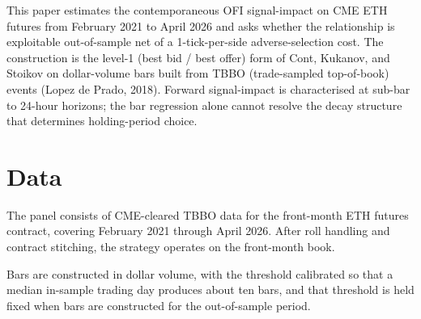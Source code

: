 ﻿\documentclass[11pt,a4paper]{article}
\begin{document}
This paper estimates the contemporaneous OFI signal-impact on CME ETH futures from February 2021 to April 2026 and asks whether the relationship is exploitable out-of-sample net of a 1-tick-per-side adverse-selection cost. The construction is the level-1 (best bid / best offer) form of Cont, Kukanov, and Stoikov on dollar-volume bars built from TBBO (trade-sampled top-of-book) events (Lopez de Prado, 2018). Forward signal-impact is characterised at sub-bar to 24-hour horizons; the bar regression alone cannot resolve the decay structure that determines holding-period choice.

\section{Data}

The panel consists of CME-cleared TBBO data for the front-month ETH futures contract, covering February 2021 through April 2026. After roll handling and contract stitching, the strategy operates on the front-month book.

Bars are constructed in dollar volume, with the threshold calibrated so that a median in-sample trading day produces about ten bars, and that threshold is held fixed when bars are constructed for the out-of-sample period.
\end{document}

